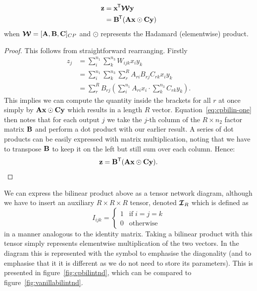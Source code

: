 {\begin{prop} \label{prop:cpbilin}
\begin{align}
	\mathbf{z} &= \mathbf{x}^{\mkern-1.5mu\mathsf{T}}\bm{\mathcal{W}}\mathbf{y} \\
			&= \mathbf{B}^{\mkern-1.5mu\mathsf{T}}(\mathbf{A}\mathbf{x} \odot \mathbf{C}\mathbf{y})
\end{align}
when \(\bm{\mathcal{W}} = [\mathbf{A}, \mathbf{B}, \mathbf{C}]_{CP}\) and \(\odot\) represents the Hadamard
(elementwise) product.
\end{prop}
\begin{proof}
This follows from straightforward rearranging. Firstly
\begin{align}
	z_j &= \sum_{i}^{n_1} \sum_k^{n_3} W_{ijk} x_i y_k \\
		&= \sum_{i}^{n_1} \sum_k^{n_3} \sum_r^R A_{ri} B_{rj} C_{rk} x_i y_k\\\label{eq:cpbilin-one}
		&= \sum_r^R B_{rj} \left( \sum_i^{n_1} A_{ri} x_i \cdot \sum_k^{n_3} C_{rk}y_k \right).
\end{align}
This implies we can compute the quantity inside the brackets for all \(r\) at once simply
by \(\mathbf{A}\mathbf{x} \odot \mathbf{C}\mathbf{y}\) which results in a length \(R\) vector. 
Equation~\eqref{eq:cpbilin-one} then notes that for each output \(j\) we take the \(j\)-th column
of the \(R \times n_2\) factor matrix \(\mathbf{B}\) and perform a dot product with our earlier
result. A series of dot products can be easily expressed with matrix multiplication, noting
that we have to transpose \(\mathbf{B}\) to keep it on the left but still sum over each column.
Hence:
\begin{equation}
	\mathbf{z} = \mathbf{B}^\mathsf{T} (\mathbf{A}\mathbf{x} \odot \mathbf{C}\mathbf{y}).
\end{equation}
\end{proof}

We can express the bilinear product above as a tensor network diagram, although we have to insert
an auxiliary \(R\times R\times R\) tensor, denoted \(\bm{\mathcal{I}}_{R}\) which is defined as
\begin{equation}\label{eq:tensoridentity}
	I_{ijk} = \begin{cases}
		1 & \mathrm{if} \; i=j=k \\
		0 & \mathrm{otherwise}
	\end{cases}
\end{equation} in a manner analogous to the identity matrix. Taking a bilinear product with this
tensor simply represents elementwise multiplication of the two vectors. In the diagram this is
represented with the symbol
 to emphasise the diagonality (and to emphasise that it
it is different as we do not need to store its parameters).
This is presented in 
figure~\ref{fig:cpbilintnd}, which can be compared to figure~\ref{fig:vanillabilintnd}.

}
